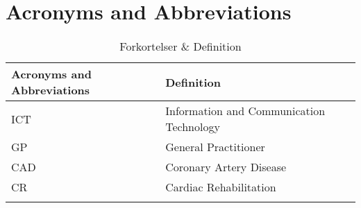 \chapter{Acronyms and Abbreviations}


\begin{longtabu} to 
	\textbf{Acronyms and Abbreviations} & \textbf{Definition}\\[-1ex]
	\midrule
	ICT & Information and Communication Technology \\[-1ex]
	GP & General Practitioner \\[-1ex]
	CAD & Coronary Artery Disease \\[-1ex]
	CR & Cardiac Rehabilitation \\[-1ex]
	\caption{Forkortelser \& Definition}
\end{longtabu}


